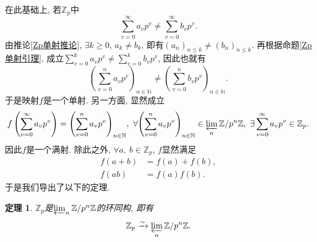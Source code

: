 \documentclass[UTF8, twoside]{ctexart}
\theoremstyle{nonumberplain}
\theoremstyle{nonumberplain}
\theoremstyle{plain}
\newtheorem{dingli}[dingyi]{定理}
\begin{document}
	在此基础上, 若${{\mathbb{Z}}_{p}}$中
	\[
		\sum_{v=0}^{\infty }{{{a}_{v}}{{p}^{v}}}\ne \sum_{v=0}^{\infty }{{{b}_{v}}{{p}^{v}}}.
	\]
	由推论\ref{Zp单射推论}, $\exists k\ge 0$, ${{a}_{k}}\ne {{b}_{k}}$, 即有${{\left( {{a}_{n}} \right)}_{n\le k}}\ne {{\left( {{b}_{n}} \right)}_{n\le k}}$. 再根据命题\ref{Zp单射引理}, 成立$\sum_{v=0}^{k}{{{a}_{v}}{{p}^{v}}}\ne \sum_{v=0}^{k}{{{b}_{v}}{{p}^{v}}}$, 因此也就有
	\[
		{{\left( \sum_{v=0}^{n}{{{a}_{v}}{{p}^{v}}} \right)}_{n\in \mathbb{N}}}\ne {{\left( \sum_{v=0}^{n}{{{b}_{v}}{{p}^{v}}} \right)}_{n\in \mathbb{N}}}.
	\]
	于是映射$f$是一个单射. 另一方面, 显然成立
	\[
		f\left( \sum\limits_{v=0}^{\infty }{{{a}_{v}}{{p}^{v}}} \right)={{\left( \sum\limits_{v=0}^{n}{{{a}_{v}}{{p}^{v}}} \right)}_{n\in \mathbb{N}}},\ \forall {{\left( \sum\limits_{v=0}^{n}{{{a}_{v}}{{p}^{v}}} \right)}_{n\in \mathbb{N}}}\in \varprojlim_n \mathbb{Z} /{{p}^{n}\mathbb{Z}},\ \exists \sum\limits_{v=0}^{\infty }{{{a}_{v}}{{p}^{v}}}\in {{\mathbb{Z}}_{p}}.
	\]
	因此$f$是一个满射. 除此之外, $\forall a,\ b\in {{\mathbb{Z}}_{p}}$, $f$显然满足
	\begin{align*}
		f\left( a+b \right)&=f\left( a \right)+f\left( b \right), \\ 
		f\left( ab \right)&=f\left( a \right)f\left( b \right).
	\end{align*}
	于是我们导出了以下的定理. 
	\begin{dingli}
		${{\mathbb{Z}}_{p}}$是$\varprojlim_n \mathbb{Z} /{{p}^{n}\mathbb{Z}}$的环同构, 即有
		\[{{\mathbb{Z}}_{p}}\xrightarrow{\sim} \varprojlim_n \mathbb{Z} /{{p}^{n}\mathbb{Z}}.\]
	\end{dingli}
	\vskip 0.5cm
	
\end{document}
